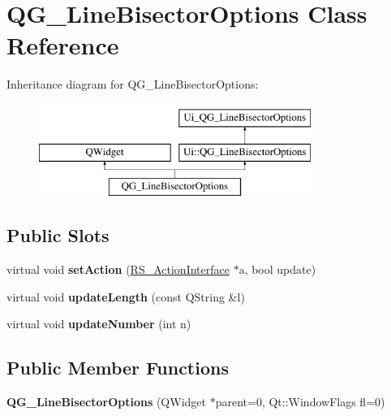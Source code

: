 \hypertarget{classQG__LineBisectorOptions}{\section{Q\-G\-\_\-\-Line\-Bisector\-Options Class Reference}
\label{classQG__LineBisectorOptions}
}
Inheritance diagram for Q\-G\-\_\-\-Line\-Bisector\-Options\-:\begin{figure}[H]
\begin{center}
\leavevmode
\includegraphics[height=3.000000cm]{classQG__LineBisectorOptions}
\end{center}
\end{figure}
\subsection*{Public Slots}
\begin{DoxyCompactItemize}
\item 
\hypertarget{classQG__LineBisectorOptions_a63e1bb6e2d3ea4818dfdad32fc0c9a81}{virtual void {\bfseries set\-Action} (\hyperlink{classRS__ActionInterface}{R\-S\-\_\-\-Action\-Interface} $\ast$a, bool update)}\label{classQG__LineBisectorOptions_a63e1bb6e2d3ea4818dfdad32fc0c9a81}

\item 
\hypertarget{classQG__LineBisectorOptions_a75b20dec9ebd6da716104e10a84c3988}{virtual void {\bfseries update\-Length} (const Q\-String \&l)}\label{classQG__LineBisectorOptions_a75b20dec9ebd6da716104e10a84c3988}

\item 
\hypertarget{classQG__LineBisectorOptions_a7ac3e44b16d2791e007cce716bfb7db6}{virtual void {\bfseries update\-Number} (int n)}\label{classQG__LineBisectorOptions_a7ac3e44b16d2791e007cce716bfb7db6}

\end{DoxyCompactItemize}
\subsection*{Public Member Functions}
\begin{DoxyCompactItemize}
\item 
\hypertarget{classQG__LineBisectorOptions_a322e6dfb2a1c85ebcc50d20c479cb41b}{{\bfseries Q\-G\-\_\-\-Line\-Bisector\-Options} (Q\-Widget $\ast$parent=0, Qt\-::\-Window\-Flags fl=0)}\label{classQG__LineBisectorOptions_a322e6dfb2a1c85ebcc50d20c479cb41b}

\end{DoxyCompactItemize}
